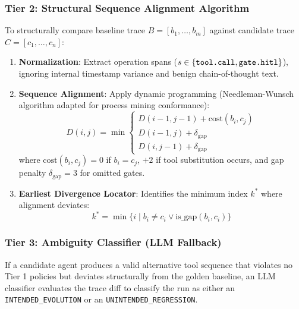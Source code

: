 \documentclass[11pt,a4paper]{article}
\begin{document}
\subsubsection{Tier 2: Structural Sequence Alignment Algorithm}
To structurally compare baseline trace $B = [b_1, \dots, b_m]$ against candidate trace $C = [c_1, \dots, c_n]$:
\begin{enumerate}[leftmargin=1.5em,noitemsep]
    \item \textbf{Normalization}: Extract operation spans ($s \in \{\text{\texttt{tool.call}}, \text{\texttt{gate.hitl}}\}$), ignoring internal timestamp variance and benign chain-of-thought text.
    \item \textbf{Sequence Alignment}: Apply dynamic programming (Needleman-Wunsch algorithm adapted for process mining conformance):
    \begin{equation}
    D(i, j) = \min \begin{cases}
    D(i-1, j-1) + \text{cost}(b_i, c_j) \\
    D(i-1, j) + \delta_{\text{gap}} \\
    D(i, j-1) + \delta_{\text{gap}}
    \end{cases}
    \end{equation}
    where $\text{cost}(b_i, c_j) = 0$ if $b_i = c_j$, $+2$ if tool substitution occurs, and gap penalty $\delta_{\text{gap}} = 3$ for omitted gates.
    \item \textbf{Earliest Divergence Locator}: Identifies the minimum index $k^*$ where alignment deviates:
    \begin{equation}
    k^* = \min \{ i \mid b_i \neq c_i \lor \text{is\_gap}(b_i, c_i) \}
    \end{equation}
\end{enumerate}

\subsubsection{Tier 3: Ambiguity Classifier (LLM Fallback)}
If a candidate agent produces a valid alternative tool sequence that violates no Tier 1 policies but deviates structurally from the golden baseline, an LLM classifier evaluates the trace diff to classify the run as either an \texttt{INTENDED\_EVOLUTION} or an \texttt{UNINTENDED\_REGRESSION}.
\end{document}
